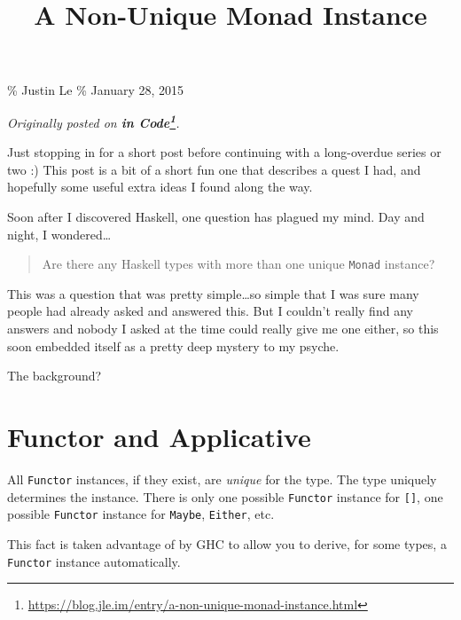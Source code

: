 \documentclass[]{article}
\title{A Non-Unique Monad Instance}
\renewcommand{\href}[2]{#2\footnote{\url{#1}}}
\begin{document}
\maketitle

\% Justin Le \% January 28, 2015

\emph{Originally posted on
\textbf{\href{https://blog.jle.im/entry/a-non-unique-monad-instance.html}{in
Code}}.}

Just stopping in for a short post before continuing with a long-overdue series
or two :) This post is a bit of a short fun one that describes a quest I had,
and hopefully some useful extra ideas I found along the way.

Soon after I discovered Haskell, one question has plagued my mind. Day and
night, I wondered\ldots{}

\begin{quote}
Are there any Haskell types with more than one unique \texttt{Monad} instance?
\end{quote}

This was a question that was pretty simple\ldots so simple that I was sure many
people had already asked and answered this. But I couldn't really find any
answers and nobody I asked at the time could really give me one either, so this
soon embedded itself as a pretty deep mystery to my psyche.

The background?

\section{Functor and Applicative}\label{functor-and-applicative}

All \texttt{Functor} instances, if they exist, are \emph{unique} for the type.
The type uniquely determines the instance. There is only one possible
\texttt{Functor} instance for \texttt{{[}{]}}, one possible \texttt{Functor}
instance for \texttt{Maybe}, \texttt{Either}, etc.

This fact is taken advantage of by GHC to allow you to derive, for some types, a
\texttt{Functor} instance automatically.
\end{document}
